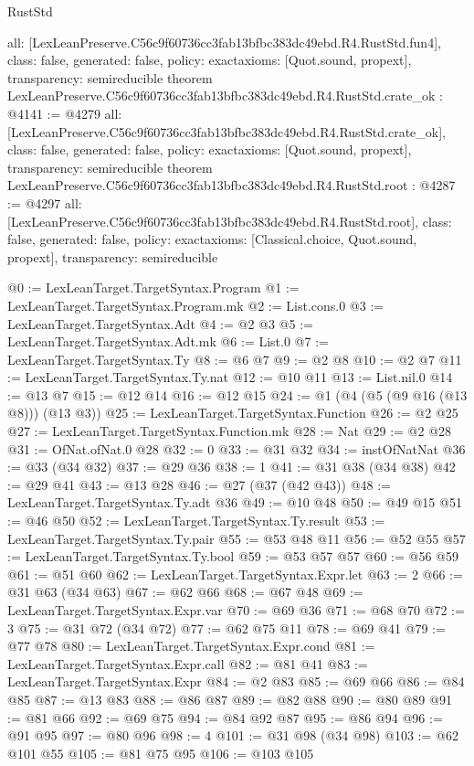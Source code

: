 \begin{lexlean}{RustStd}
\begin{coremodule}
{  all: [LexLeanPreserve.C56c9f60736cc3fab13bfbc383dc49ebd.R4.RustStd.fun4],
  class: false,
  generated: false,
  policy: exact{axioms: [Quot.sound, propext]},
  transparency: semireducible
}
theorem LexLeanPreserve.C56c9f60736cc3fab13bfbc383dc49ebd.R4.RustStd.crate_ok : @4141 := @4279 {
  all: [LexLeanPreserve.C56c9f60736cc3fab13bfbc383dc49ebd.R4.RustStd.crate_ok],
  class: false,
  generated: false,
  policy: exact{axioms: [Quot.sound, propext]},
  transparency: semireducible
}
theorem LexLeanPreserve.C56c9f60736cc3fab13bfbc383dc49ebd.R4.RustStd.root : @4287 := @4297 {
  all: [LexLeanPreserve.C56c9f60736cc3fab13bfbc383dc49ebd.R4.RustStd.root],
  class: false,
  generated: false,
  policy: exact{axioms: [Classical.choice, Quot.sound, propext]},
  transparency: semireducible
}

@0 := LexLeanTarget.TargetSyntax.Program
@1 := LexLeanTarget.TargetSyntax.Program.mk
@2 := List.cons.{0}
@3 := LexLeanTarget.TargetSyntax.Adt
@4 := @2 @3
@5 := LexLeanTarget.TargetSyntax.Adt.mk
@6 := List.{0}
@7 := LexLeanTarget.TargetSyntax.Ty
@8 := @6 @7
@9 := @2 @8
@10 := @2 @7
@11 := LexLeanTarget.TargetSyntax.Ty.nat
@12 := @10 @11
@13 := List.nil.{0}
@14 := @13 @7
@15 := @12 @14
@16 := @12 @15
@24 := @1 (@4 (@5 (@9 @16 (@13 @8))) (@13 @3))
@25 := LexLeanTarget.TargetSyntax.Function
@26 := @2 @25
@27 := LexLeanTarget.TargetSyntax.Function.mk
@28 := Nat
@29 := @2 @28
@31 := OfNat.ofNat.{0} @28
@32 := 0
@33 := @31 @32
@34 := instOfNatNat
@36 := @33 (@34 @32)
@37 := @29 @36
@38 := 1
@41 := @31 @38 (@34 @38)
@42 := @29 @41
@43 := @13 @28
@46 := @27 (@37 (@42 @43))
@48 := LexLeanTarget.TargetSyntax.Ty.adt @36
@49 := @10 @48
@50 := @49 @15
@51 := @46 @50
@52 := LexLeanTarget.TargetSyntax.Ty.result
@53 := LexLeanTarget.TargetSyntax.Ty.pair
@55 := @53 @48 @11
@56 := @52 @55
@57 := LexLeanTarget.TargetSyntax.Ty.bool
@59 := @53 @57 @57
@60 := @56 @59
@61 := @51 @60
@62 := LexLeanTarget.TargetSyntax.Expr.let
@63 := 2
@66 := @31 @63 (@34 @63)
@67 := @62 @66
@68 := @67 @48
@69 := LexLeanTarget.TargetSyntax.Expr.var
@70 := @69 @36
@71 := @68 @70
@72 := 3
@75 := @31 @72 (@34 @72)
@77 := @62 @75 @11
@78 := @69 @41
@79 := @77 @78
@80 := LexLeanTarget.TargetSyntax.Expr.cond
@81 := LexLeanTarget.TargetSyntax.Expr.call
@82 := @81 @41
@83 := LexLeanTarget.TargetSyntax.Expr
@84 := @2 @83
@85 := @69 @66
@86 := @84 @85
@87 := @13 @83
@88 := @86 @87
@89 := @82 @88
@90 := @80 @89
@91 := @81 @66
@92 := @69 @75
@94 := @84 @92 @87
@95 := @86 @94
@96 := @91 @95
@97 := @80 @96
@98 := 4
@101 := @31 @98 (@34 @98)
@103 := @62 @101 @55
@105 := @81 @75 @95
@106 := @103 @105

\end{coremodule}
\end{lexlean}
